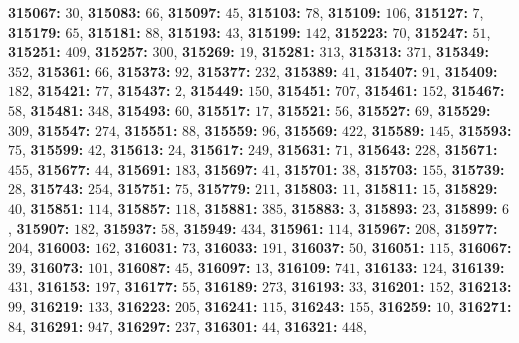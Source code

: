 \textsf{\bfseries 315067:} $30$, \textsf{\bfseries 315083:} $66$, \textsf{\bfseries 315097:} $45$, \textsf{\bfseries 315103:} $78$, \textsf{\bfseries 315109:} $106$, \textsf{\bfseries 315127:} $7$, \textsf{\bfseries 315179:} $65$, \textsf{\bfseries 315181:} $88$, \textsf{\bfseries 315193:} $43$, \textsf{\bfseries 315199:} $142$, \textsf{\bfseries 315223:} $70$, \textsf{\bfseries 315247:} $51$, \textsf{\bfseries 315251:} $409$, \textsf{\bfseries 315257:} $300$, \textsf{\bfseries 315269:} $19$, \textsf{\bfseries 315281:} $313$, \textsf{\bfseries 315313:} $371$, \textsf{\bfseries 315349:} $352$, \textsf{\bfseries 315361:} $66$, \textsf{\bfseries 315373:} $92$, \textsf{\bfseries 315377:} $232$, \textsf{\bfseries 315389:} $41$, \textsf{\bfseries 315407:} $91$, \textsf{\bfseries 315409:} $182$, \textsf{\bfseries 315421:} $77$, \textsf{\bfseries 315437:} $2$, \textsf{\bfseries 315449:} $150$, \textsf{\bfseries 315451:} $707$, \textsf{\bfseries 315461:} $152$, \textsf{\bfseries 315467:} $58$, \textsf{\bfseries 315481:} $348$, \textsf{\bfseries 315493:} $60$, \textsf{\bfseries 315517:} $17$, \textsf{\bfseries 315521:} $56$, \textsf{\bfseries 315527:} $69$, \textsf{\bfseries 315529:} $309$, \textsf{\bfseries 315547:} $274$, \textsf{\bfseries 315551:} $88$, \textsf{\bfseries 315559:} $96$, \textsf{\bfseries 315569:} $422$, \textsf{\bfseries 315589:} $145$, \textsf{\bfseries 315593:} $75$, \textsf{\bfseries 315599:} $42$, \textsf{\bfseries 315613:} $24$, \textsf{\bfseries 315617:} $249$, \textsf{\bfseries 315631:} $71$, \textsf{\bfseries 315643:} $228$, \textsf{\bfseries 315671:} $455$, \textsf{\bfseries 315677:} $44$, \textsf{\bfseries 315691:} $183$, \textsf{\bfseries 315697:} $41$, \textsf{\bfseries 315701:} $38$, \textsf{\bfseries 315703:} $155$, \textsf{\bfseries 315739:} $28$, \textsf{\bfseries 315743:} $254$, \textsf{\bfseries 315751:} $75$, \textsf{\bfseries 315779:} $211$, \textsf{\bfseries 315803:} $11$, \textsf{\bfseries 315811:} $15$, \textsf{\bfseries 315829:} $40$, \textsf{\bfseries 315851:} $114$, \textsf{\bfseries 315857:} $118$, \textsf{\bfseries 315881:} $385$, \textsf{\bfseries 315883:} $3$, \textsf{\bfseries 315893:} $23$, \textsf{\bfseries 315899:} $6$, \textsf{\bfseries 315907:} $182$, \textsf{\bfseries 315937:} $58$, \textsf{\bfseries 315949:} $434$, \textsf{\bfseries 315961:} $114$, \textsf{\bfseries 315967:} $208$, \textsf{\bfseries 315977:} $204$, \textsf{\bfseries 316003:} $162$, \textsf{\bfseries 316031:} $73$, \textsf{\bfseries 316033:} $191$, \textsf{\bfseries 316037:} $50$, \textsf{\bfseries 316051:} $115$, \textsf{\bfseries 316067:} $39$, \textsf{\bfseries 316073:} $101$, \textsf{\bfseries 316087:} $45$, \textsf{\bfseries 316097:} $13$, \textsf{\bfseries 316109:} $741$, \textsf{\bfseries 316133:} $124$, \textsf{\bfseries 316139:} $431$, \textsf{\bfseries 316153:} $197$, \textsf{\bfseries 316177:} $55$, \textsf{\bfseries 316189:} $273$, \textsf{\bfseries 316193:} $33$, \textsf{\bfseries 316201:} $152$, \textsf{\bfseries 316213:} $99$, \textsf{\bfseries 316219:} $133$, \textsf{\bfseries 316223:} $205$, \textsf{\bfseries 316241:} $115$, \textsf{\bfseries 316243:} $155$, \textsf{\bfseries 316259:} $10$, \textsf{\bfseries 316271:} $84$, \textsf{\bfseries 316291:} $947$, \textsf{\bfseries 316297:} $237$, \textsf{\bfseries 316301:} $44$, \textsf{\bfseries 316321:} $448$, 
